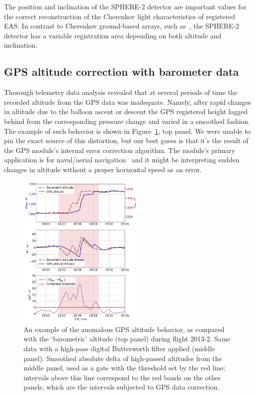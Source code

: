 \documentclass[universe,article,submit,moreauthors,pdftex]{Definitions/mdpi}
\begin{document}
\begin{paracol}{2}
The position and inclination of the SPHERE-2 detector are important values for the correct reconstruction of the Cherenkov light characteristics of registered EAS. In contrast to Cherenkov ground-based arrays, such as~\cite{Yakutsk19,TUNKA133}, the SPHERE-2 detector has a variable registration area depending on both altitude and inclination.


\subsection{GPS altitude correction with barometer data}
\label{sect:gps_correction}

Thorough telemetry data analysis revealed that at several periods of time the recorded altitude from the GPS data was inadequate. Namely, after rapid changes in altitude due to the balloon ascent or descent the GPS registered height lagged behind from the corresponding pressure change and varied in a smoothed fashion. The example of such behavior is shown in Figure~\ref{fig:h_corr}, top panel. We were unable to pin the exact source of this distortion, but our best guess is that it's the result of the GPS module's internal error correction algorithm. The module's primary application is for naval/aerial navigation~\cite{GPS-module-specs} and it might be interpreting sudden changes in altitude without a proper horizontal speed as an error.


\begin{figure}[tb]
    \includegraphics[width=0.55\textwidth]{figs/2013-2_gps_correction.pdf} 
    \caption{An example of the anomalous GPS altitude behavior, as compared with the `barometric' altitude (top panel) during flight 2013-2. Same data with a high-pass digital Butterworth filter applied (middle panel). Smoothed absolute delta of high-passed altitudes from the middle panel, used as a gate with the threshold set by the red line; intervals above this line correspond to the red bands on the other panels, which are the intervals subjected to GPS data correction.}
\label{fig:h_corr}
\end{figure}


\end{paracol}
\end{document}
